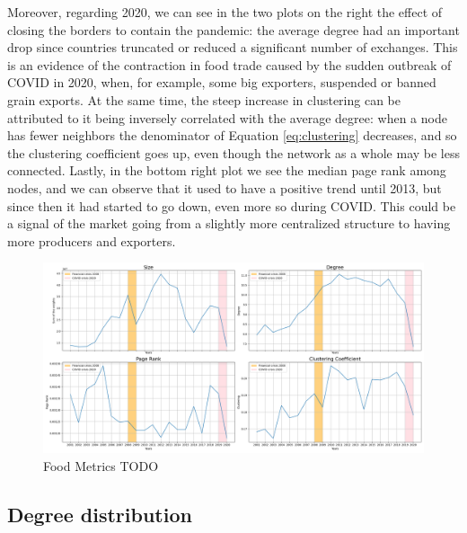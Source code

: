 Moreover, regarding 2020, we can see in the two plots on the right the effect of closing the borders to contain the pandemic: the average degree had an important drop since countries truncated or reduced a significant number of exchanges. This is an evidence of the contraction in food trade caused by the sudden outbreak of COVID in 2020, when, for example, some big exporters, suspended or banned grain exports.
At the same time, the steep increase in clustering can be attributed to it being inversely correlated with the average degree: when a node has fewer neighbors the denominator of Equation \ref{eq:clustering} decreases, and so the clustering coefficient goes up, even though the network as a whole may be less connected.
Lastly, in the bottom right plot we see the median page rank among nodes, and we can observe that it used to have a positive trend until 2013, but since then it had started to go down, even more so during COVID. This could be a signal of the market going from a slightly more centralized structure to having more producers and exporters.

\begin{figure}[H]
    \centering
    \includegraphics[width=\textwidth]{pics/full_p10_metric_ts.png}
    \caption{Food Metrics TODO}
    \label{fig:foodmetrics}
\end{figure}

\subsection{Degree distribution}

